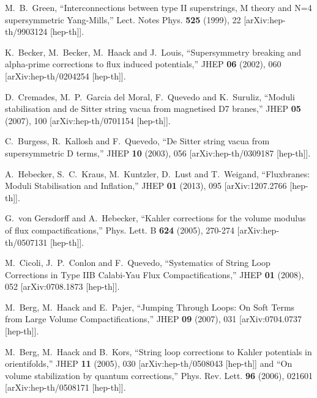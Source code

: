 \documentclass[12pt]{article}
\numberwithin{equation}{section}
\begin{document}
\begin{thebibliography}{999}
M.~B.~Green,
``Interconnections between type II superstrings, M theory and N=4 supersymmetric Yang-Mills,''
Lect. Notes Phys. \textbf{525} (1999), 22
[arXiv:hep-th/9903124 [hep-th]].

K.~Becker, M.~Becker, M.~Haack and J.~Louis,
``Supersymmetry breaking and alpha-prime corrections to flux induced potentials,''
JHEP \textbf{06} (2002), 060
[arXiv:hep-th/0204254 [hep-th]].

D.~Cremades, M.~P.~Garcia del Moral, F.~Quevedo and K.~Suruliz,
``Moduli stabilisation and de Sitter string vacua from magnetised D7 branes,''
JHEP \textbf{05} (2007), 100
[arXiv:hep-th/0701154 [hep-th]].

C.~Burgess, R.~Kallosh and F.~Quevedo,
``De Sitter string vacua from supersymmetric D terms,''
JHEP \textbf{10} (2003), 056
[arXiv:hep-th/0309187 [hep-th]].

A.~Hebecker, S.~C.~Kraus, M.~Kuntzler, D.~Lust and T.~Weigand,
``Fluxbranes: Moduli Stabilisation and Inflation,''
JHEP \textbf{01} (2013), 095
[arXiv:1207.2766 [hep-th]].

G.~von Gersdorff and A.~Hebecker,
``Kahler corrections for the volume modulus of flux compactifications,''
Phys. Lett. B \textbf{624} (2005), 270-274
[arXiv:hep-th/0507131 [hep-th]].

M.~Cicoli, J.~P.~Conlon and F.~Quevedo,
``Systematics of String Loop Corrections in Type IIB Calabi-Yau Flux Compactifications,''
JHEP \textbf{01} (2008), 052
[arXiv:0708.1873 [hep-th]].

M.~Berg, M.~Haack and E.~Pajer,
``Jumping Through Loops: On Soft Terms from Large Volume Compactifications,''
JHEP \textbf{09} (2007), 031
[arXiv:0704.0737 [hep-th]].

M.~Berg, M.~Haack and B.~Kors,
``String loop corrections to Kahler potentials in orientifolds,''
JHEP \textbf{11} (2005), 030
[arXiv:hep-th/0508043 [hep-th]]
and 
``On volume stabilization by quantum corrections,''
Phys. Rev. Lett. \textbf{96} (2006), 021601
[arXiv:hep-th/0508171 [hep-th]].


\end{thebibliography}
\end{document}

